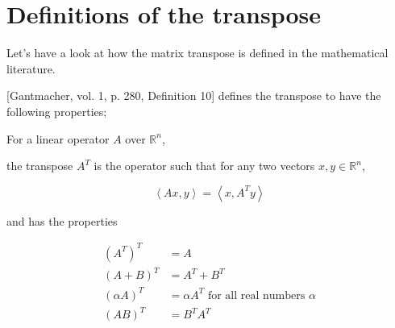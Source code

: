 \section{Definitions of the transpose}

Let's have a look at how the matrix transpose is defined in the mathematical literature.

[Gantmacher, vol. 1, p. 280, Definition 10] defines the transpose to have the following properties;

For a linear operator $A$ over $\mathbb R^n$,

the transpose $A^T$ is the operator such that for any two vectors $x, y \in \mathbb R^n$,

\[
\left\langle Ax, y \right\rangle = \left\langle x, A^T y \right\rangle
\]

and has the properties

\begin{align}

(A^T)^T & = A \\
(A + B)^T & = A^T + B^T \\
(\alpha A)^T & = \alpha A^T \text{ for all real numbers } \alpha \\
(A B)^T & = B^T A^T

\end{align}